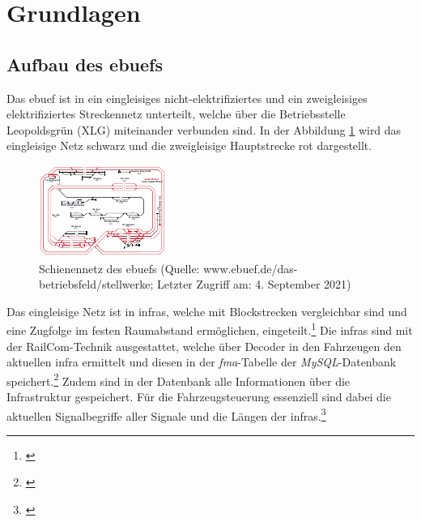 \section{Grundlagen} \label{grundlagenKapitel}
\subsection{Aufbau des \acl{ebuef}s}
Das \ac{ebuef} ist in ein eingleisiges nicht-elektrifiziertes und ein zweigleisiges elektrifiziertes Streckennetz unterteilt, welche über die Betriebsstelle Leopoldsgrün (XLG) miteinander verbunden sind. In der Abbildung \ref{fig:ebuefNetz} wird das eingleisige Netz schwarz und die zweigleisige Hauptstrecke rot dargestellt.
\begin{figure}
  \includegraphics[width=\linewidth]{../images/netz/plan.pdf}
  \caption[Schienennetz des \ac{ebuef}s]{Schienennetz des \ac{ebuef}s (Quelle: www.ebuef.de/das-betriebs\-feld/stell\-werke; Letzter Zugriff am: 4. September 2021)}
  \label{fig:ebuefNetz}
\end{figure}
Das eingleisige Netz ist in \acp{infra}, welche mit Blockstrecken vergleichbar sind und eine Zugfolge im festen Raumabstand ermöglichen, eingeteilt.\footnote{\citet[S. 7, 42]{pachl1999systemtechnik}} Die \acp{infra} sind mit der RailCom-Technik ausgestattet, welche über Decoder in den Fahrzeugen den aktuellen \ac{infra} ermittelt und diesen in der \textit{fma}-Tabelle der \textit{MySQL}-Datenbank speichert.\footnote{\cite{railcomnorm}} Zudem sind in der Datenbank alle Informationen über die Infrastruktur gespeichert. Für die Fahrzeugsteuerung essenziell sind dabei die aktuellen Signalbegriffe aller Signale und die Längen der \acp{infra}.\footnote{\cite{ebuef}}

